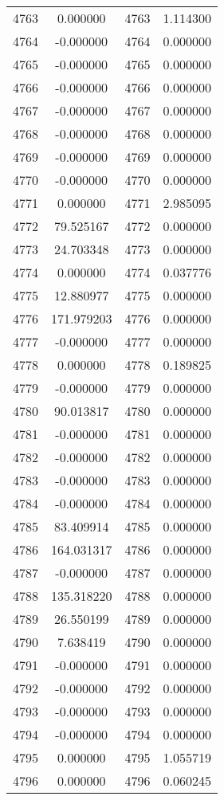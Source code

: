 \documentclass[12pt]{article}
\begin{document}
\begin{longtable}{@{}cccc@{}}
4763 & 0.000000 & 4763 & 1.114300 \\
4764 & -0.000000 & 4764 & 0.000000 \\
4765 & -0.000000 & 4765 & 0.000000 \\
4766 & -0.000000 & 4766 & 0.000000 \\
4767 & -0.000000 & 4767 & 0.000000 \\
4768 & -0.000000 & 4768 & 0.000000 \\
4769 & -0.000000 & 4769 & 0.000000 \\
4770 & -0.000000 & 4770 & 0.000000 \\
4771 & 0.000000 & 4771 & 2.985095 \\
4772 & 79.525167 & 4772 & 0.000000 \\
4773 & 24.703348 & 4773 & 0.000000 \\
4774 & 0.000000 & 4774 & 0.037776 \\
4775 & 12.880977 & 4775 & 0.000000 \\
4776 & 171.979203 & 4776 & 0.000000 \\
4777 & -0.000000 & 4777 & 0.000000 \\
4778 & 0.000000 & 4778 & 0.189825 \\
4779 & -0.000000 & 4779 & 0.000000 \\
4780 & 90.013817 & 4780 & 0.000000 \\
4781 & -0.000000 & 4781 & 0.000000 \\
4782 & -0.000000 & 4782 & 0.000000 \\
4783 & -0.000000 & 4783 & 0.000000 \\
4784 & -0.000000 & 4784 & 0.000000 \\
4785 & 83.409914 & 4785 & 0.000000 \\
4786 & 164.031317 & 4786 & 0.000000 \\
4787 & -0.000000 & 4787 & 0.000000 \\
4788 & 135.318220 & 4788 & 0.000000 \\
4789 & 26.550199 & 4789 & 0.000000 \\
4790 & 7.638419 & 4790 & 0.000000 \\
4791 & -0.000000 & 4791 & 0.000000 \\
4792 & -0.000000 & 4792 & 0.000000 \\
4793 & -0.000000 & 4793 & 0.000000 \\
4794 & -0.000000 & 4794 & 0.000000 \\
4795 & 0.000000 & 4795 & 1.055719 \\
4796 & 0.000000 & 4796 & 0.060245 \\

\end{longtable}
\end{document}
